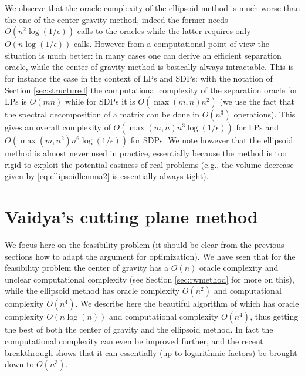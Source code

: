 We observe that the oracle complexity of the ellipsoid method is much worse than the one of the center gravity method, indeed the former needs $O(n^2 \log(1/\epsilon))$ calls to the oracles while the latter requires only $O(n \log(1/\epsilon))$ calls. However from a computational point of view the situation is much better: in many cases one can derive an efficient separation oracle, while the center of gravity method is basically always intractable. This is for instance the case in the context of LPs and SDPs: with the notation of Section \ref{sec:structured} the computational complexity of the separation oracle for LPs is $O(m n)$ while for SDPs it is $O(\max(m,n) n^2)$ (we use the fact that the spectral decomposition of a matrix can be done in $O(n^3)$ operations). This gives an overall complexity of $O(\max(m,n) n^3 \log(1/\epsilon))$ for LPs and $O(\max(m,n^2) n^6 \log(1/\epsilon))$ for SDPs. We note however that the ellipsoid method is almost never used in practice, essentially because the method is too rigid to exploit the potential easiness of real problems (e.g., the volume decrease given by \eqref{eq:ellipsoidlemma2} is essentially always tight).


\section{Vaidya's cutting plane method}
We focus here on the feasibility problem (it should be clear from the previous sections how to adapt the argument for optimization). We have seen that for the feasibility problem the center of gravity has a $O(n)$ oracle complexity and unclear computational complexity (see Section \ref{sec:rwmethod} for more on this), while the ellipsoid method has oracle complexity $O(n^2)$ and computational complexity $O(n^4)$. We describe here the beautiful algorithm of \cite{Vai89, Vai96} which has oracle complexity $O(n \log(n))$ and computational complexity $O(n^4)$, thus getting the best of both the center of gravity and the ellipsoid method. In fact the computational complexity can even be improved further, and the recent breakthrough \cite{LSW15} shows that it can essentially (up to logarithmic factors) be brought down to $O(n^3)$.

